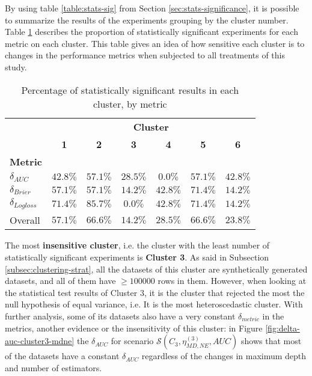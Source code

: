 By using table \ref{table:stats-sig} from Section \ref{sec:stats-significance}, it is possible to summarize the results of the experiments grouping by the cluster number. Table \ref{table:stats-clusters} describes the proportion of statistically significant experiments for each metric on each cluster. This table gives an idea of how sensitive each cluster is to changes in the performance metrics when subjected to all treatments of this study.

\begin{table}[H]
    \centering
    \begin{tabular}{l|cccccc}
              & \multicolumn{6}{c}{\textbf{\large Cluster}}                                    \\
              & \textbf{1} & \textbf{2} & \textbf{3} & \textbf{4} & \textbf{5} & \textbf{6}    \\
    \textbf{\large Metric} &          &          &          &          &          &          \\
    \midrule
    $\delta_{AUC}$         & $42.8\%$ & $57.1\%$ & $28.5\%$ & $0.0\%$  & $57.1\%$ & $42.8\%$ \\
    $\delta_{Brier}$       & $57.1\%$ & $57.1\%$ & $14.2\%$ & $42.8\%$ & $71.4\%$ & $14.2\%$ \\
    $\delta_{Logloss}$     & $71.4\%$ & $85.7\%$ & $0.0\%$  & $42.8\%$ & $71.4\%$ & $14.2\%$ \\
    \midrule
                   Overall & $57.1\%$ & $66.6\%$ & $14.2\%$ & $28.5\%$ & $66.6\%$ & $23.8\%$ 
    \end{tabular}
    \caption{Percentage of statistically significant results in each cluster, by metric}
    \label{table:stats-clusters}
\end{table}

The most \textbf{insensitive cluster}, i.e. the cluster with the least number of statistically significant experiments is \textbf{Cluster 3}. As said in Subsection \ref{subsec:clustering-strat}, all the datasets of this cluster are synthetically generated datasets, and all of them have $\geq 100000$ rows in them.  However, when looking at the statistical test results of Cluster 3, it is the cluster that rejected the most the null hypothesis of equal variance, i.e. It is the most heteroscedastic cluster. With further analysis, some of its datasets also have a very constant $\delta_{metric}$ in the metrics, another evidence or the insensitivity of this cluster: in Figure \ref{fig:delta-auc-cluster3-mdne} the $\delta_{AUC}$ for scenario $\mathcal{S}(C_3, \eta^{(3)}_{MD, NE}, AUC)$ shows that most of the datasets have a constant $\delta_{AUC}$ regardless of the changes in maximum depth and number of estimators.

